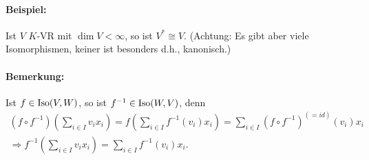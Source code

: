 \paragraph{Beispiel: }
	Ist $V$ $K$-VR mit $\dim V < \infty$, so ist $V^\ast \cong V$. (Achtung: Es gibt aber viele Isomorphismen, keiner ist besonders d.h., \glqq kanonisch\grqq .)
	
\paragraph{Bemerkung: }
	Ist $f\in \operatorname{Iso}(V,W)$, so ist $f^{-1}\in \operatorname{Iso}(W,V)$, denn
	\begin{gather*}
		(f\circ f^{-1})(\sum_{i\in I}v_ix_i) = f(\sum_{i\in I}f^{-1}(v_i)x_i) = \sum_{i\in I}(f\circ f^{-1})^{(= id)}(v_i)x_i\\
		\Rightarrow f^{-1}(\sum_{i\in I}v_ix_i) = \sum_{i\in I}f^{-1}(v_i)x_i.
	\end{gather*}
